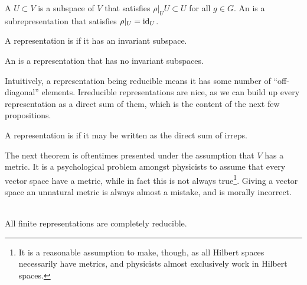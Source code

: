 \documentclass[11pt]{article}
\begin{document}
\begin{definition}
    A  $U \subset V$ is a subspace
    of $V$ that satisfies $\rho|_U U \subset U$ for all $g \in G$.
    An  is a subrepresentation that
    satisfies $\rho|_U = \operatorname{id}_U$.
\end{definition}

\begin{definition}
    A representation is  if it has an invariant subspace.
\end{definition}


\begin{definition}
    An  is a representation
    that has no invariant subspaces.
\end{definition}

Intuitively, a representation being reducible means it has
some number of ``off-diagonal'' elements. Irreducible representations
are nice, as we can build up every representation as a direct sum
of them, which is the content of the next few propositions.

\begin{definition}
    A representation is  if
    it may be written as the direct sum of irreps.
\end{definition}

\begin{reemark}
    [Unitarity]
    The next theorem is oftentimes presented under the assumption
    that $V$ has a metric. It is a psychological problem amongst physicists 
    to assume that every vector space have a metric, while in fact this is not 
    always true\footnote{It is a reasonable assumption to make, though, as all 
    Hilbert spaces necessarily have metrics, and physicists almost exclusively 
    work in Hilbert spaces.}. Giving a vector space an unnatural
    metric is always almost a mistake, and is morally incorrect.
\end{reemark}

\begin{theorem}{}\\
    All finite representations are completely reducible.
\end{theorem}
\end{document}
